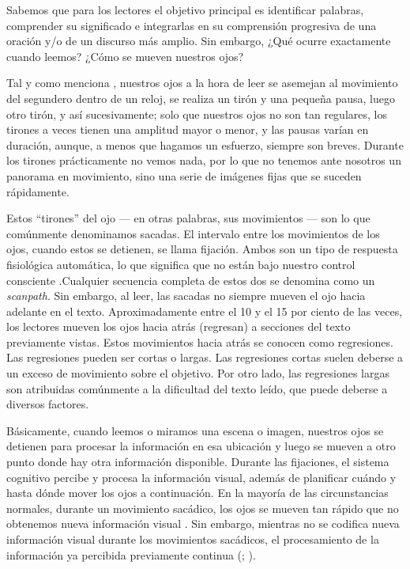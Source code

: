 Sabemos que para los lectores el objetivo principal es identificar palabras, comprender su significado e integrarlas en su comprensión progresiva de una oración y/o de un discurso más amplio. Sin embargo, ¿Qué ocurre exactamente cuando leemos? ¿Cómo se mueven nuestros ojos?

Tal y como menciona \textcite{Brown1895}, nuestros ojos a la hora de leer se asemejan al movimiento del segundero dentro de un reloj, se realiza un tirón y una pequeña pausa, luego otro tirón, y así sucesivamente; solo que nuestros ojos no son tan regulares, los tirones a veces tienen una amplitud mayor o menor, y las pausas varían en duración, aunque, a menos que hagamos un esfuerzo, siempre son breves. Durante los tirones prácticamente no vemos nada, por lo que no tenemos ante nosotros un panorama en movimiento, sino una serie de imágenes fijas que se suceden rápidamente.

Estos “tirones” del ojo — en otras palabras, sus movimientos — son lo que comúnmente denominamos sacadas. El intervalo entre los movimientos de los ojos, cuando estos se detienen, se llama fijación. Ambos son un tipo de respuesta fisiológica automática, lo que significa que no están bajo nuestro control consciente \parencite{Rayner2012}.Cualquier secuencia completa de estos dos se denomina como un \textit{scanpath}. Sin embargo, al leer, las sacadas no siempre mueven el ojo hacia adelante en el texto. Aproximadamente entre el 10 y el 15 por ciento de las veces, los lectores mueven los ojos hacia atrás (regresan) a secciones del texto previamente vistas. Estos movimientos hacia atrás se conocen como regresiones. Las regresiones pueden ser cortas o largas. Las regresiones cortas suelen deberse a un exceso de movimiento sobre el objetivo. Por otro lado, las regresiones largas son atribuidas comúnmente a la dificultad del texto leído, que puede deberse a diversos factores.

Básicamente, cuando leemos o miramos una escena o imagen, nuestros ojos se detienen para procesar la información en esa ubicación y luego se mueven a otro punto donde hay otra información disponible. Durante las fijaciones, el sistema cognitivo percibe y procesa la información visual, además de planificar cuándo y hasta dónde mover los ojos a continuación. En la mayoría de las circunstancias normales, durante un movimiento sacádico, los ojos se mueven tan rápido que no obtenemos nueva información visual \parencite{Rayner2009}. Sin embargo, mientras no se codifica nueva información visual durante los movimientos sacádicos, el procesamiento de la información ya percibida previamente continua (\cite{Irwin1998}; \cite{Irwin1996}).  

